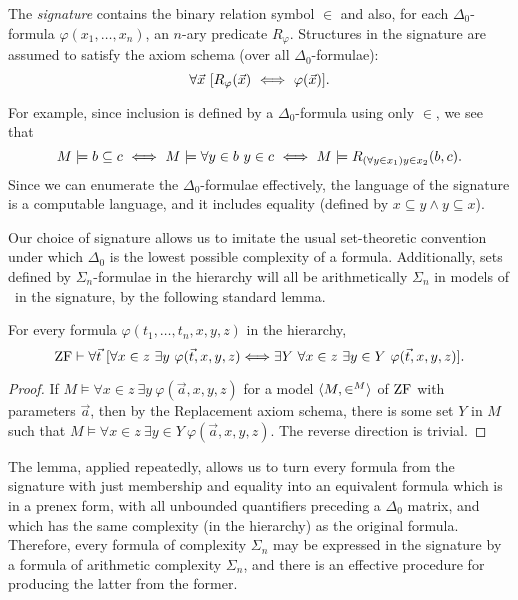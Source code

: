 \documentclass{amsart}
\begin{document}
\begin{definition}\label{Definition.Levy.signature}
The \emph{\Levy{} signature} contains the binary relation symbol $\in$ and also, for each $\Delta_0$-formula $\varphi(x_1,\ldots,x_n)$, an $n$-ary predicate $R_{\varphi}$.  Structures in the \Levy{} signature are assumed to satisfy the axiom schema (over all $\Delta_0$-formulae):
$$ \forall \vec x\ [R_{\varphi}(\vec x) \ \mathrel{\Longleftrightarrow} \ \varphi(\vec x)].$$
\end{definition}
For example, since inclusion is defined by a $\Delta_0$-formula using only $\in$, we see that
$$ M\models b\subseteq c \ \Iff \ M\models \forall y\in b\ y\in c
\ \Iff \ M\models R_{(\forall y\in x_1)y\in x_2}(b,c).$$
Since we can enumerate the $\Delta_0$-formulae effectively, the language of the \Levy{} signature is a computable language, and it includes equality (defined by $x\subseteq y \land y\subseteq x$).

Our choice of signature allows us to imitate the usual set-theoretic convention under which $\Delta_0$ is the lowest possible complexity of a formula.
Additionally, sets defined by $\Sigma_n$-formulae in the \Levy{} hierarchy will all be arithmetically $\Sigma_n$
in models of \ZF\ in the \Levy{} signature, by the following standard lemma.
\begin{lemma}
\label{lemma.Levy.signature}
For every formula $\varphi(t_1,\ldots,t_n,x,y,z)$ in the \Levy{} hierarchy,
$$ {\rm ZF} \vdash \forall\vec t\
[\forall x\in z\ \exists y\ \varphi(\vec t,x,y,z) \Longleftrightarrow \exists Y\ \forall x\in z\ \exists y \in Y\ \varphi(\vec t,x,y,z)].$$
\end{lemma}

\begin{proof}
If $M \models \forall x\in z\ \exists y\ \varphi(\vec a,x,y,z)$ for a model $\<M,\in^M>$ of ${\rm ZF}$ with parameters $\vec a$, then by the Replacement axiom schema, there is some set $Y$ in $M$ such that $M \models \forall x\in z\ \exists y\in Y\ \varphi(\vec a,x,y,z)$.  The reverse direction is trivial.
\end{proof}

The lemma, applied repeatedly, allows us to turn every formula from the signature with just membership and equality into an equivalent formula which is in a prenex form, with all unbounded quantifiers preceding a $\Delta_0$ matrix, and which has the same complexity (in the \Levy{} hierarchy) as the original formula. Therefore, every formula of \Levy{} complexity $\Sigma_n$ may be expressed in the \Levy{} signature by a formula of arithmetic complexity $\Sigma_n$, and there is an effective procedure for producing the latter from the former.
\end{document}
